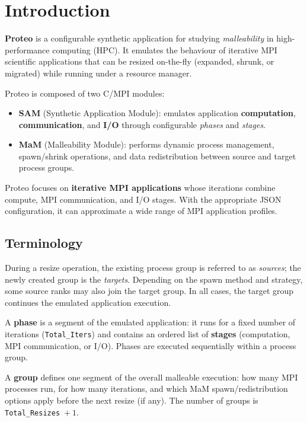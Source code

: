 \section{Introduction}
\label{section:introduction}

\textbf{Proteo} is a configurable synthetic application for studying \textit{malleability} in high-performance computing (HPC). It emulates the behaviour of iterative MPI scientific applications that can be resized on-the-fly (expanded, shrunk, or migrated) while running under a resource manager.

Proteo is composed of two C/MPI modules:

\begin{itemize}
  \item \textbf{SAM} (Synthetic Application Module): emulates application \textbf{computation}, \textbf{communication}, and \textbf{I/O} through configurable \textit{phases} and \textit{stages}.
  \item \textbf{MaM} (Malleability Module): performs dynamic process management, spawn/shrink operations, and data redistribution between source and target process groups.
\end{itemize}

Proteo focuses on \textbf{iterative MPI applications} whose iterations combine compute, MPI communication, and I/O stages. With the appropriate JSON configuration, it can approximate a wide range of MPI application profiles.

\subsection{Terminology}

During a resize operation, the existing process group is referred to as \textit{sources}; the newly created group is the \textit{targets}. Depending on the spawn method and strategy, some source ranks may also join the target group. In all cases, the target group continues the emulated application execution.

A \textbf{phase} is a segment of the emulated application: it runs for a fixed number of iterations (\texttt{Total\_Iters}) and contains an ordered list of \textbf{stages} (computation, MPI communication, or I/O). Phases are executed sequentially within a process group.

A \textbf{group} defines one segment of the overall malleable execution: how many MPI processes run, for how many iterations, and which MaM spawn/redistribution options apply before the next resize (if any). The number of groups is \texttt{Total\_Resizes}~$+~1$.

